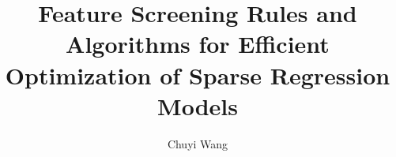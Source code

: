 

\abtitlepgtrue
\abstractpgtrue
\titlepgtrue
\copyrighttrue %
\acktrue %
\tablecontentstrue
\tablespagetrue
\figurespagetrue

\title{Feature Screening Rules and Algorithms for Efficient Optimization of Sparse Regression Models }
\author{Chuyi Wang}


\newcommand{\abstextwithesis}
{
abstract
}



 
\newcommand{\acknowledgement}
{
acknowledgment 
}

\newcommand{\pubabstextwithesis}
{
Public abstract

}

\beforepreface
\afterpreface




















